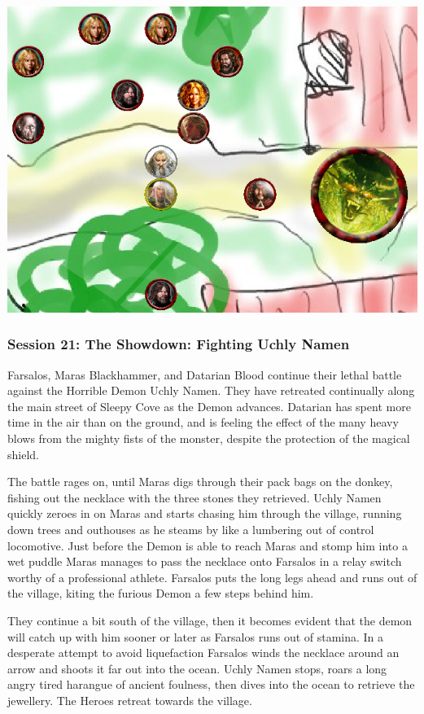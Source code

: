 \begin{center}
\vspace{0.5 cm}
\includegraphics[width=0.7\linewidth]{./figs/playthrough/battle-sleepy-cove.png}
\vspace{0.5 cm}
\end{center}


\subsubsection*{Session 21: The Showdown: Fighting Uchly Namen}
Farsalos, Maras Blackhammer, and Datarian Blood continue their lethal battle against the Horrible Demon Uchly Namen. They have retreated continually along the main street of Sleepy Cove as the Demon advances. Datarian has spent more time in the air than on the ground, and is feeling the effect of the many heavy blows from the mighty fists of the monster, despite the protection of the magical shield.

The battle rages on, until Maras digs through their pack bags on the donkey, fishing out the necklace with the three stones they retrieved. Uchly Namen quickly zeroes in on Maras and starts chasing him through the village, running down trees and outhouses as he steams by like a lumbering out of control locomotive. Just before the Demon is able to reach Maras and stomp him into a wet puddle Maras manages to pass the necklace onto Farsalos in a relay switch worthy of a professional athlete. Farsalos puts the long legs ahead and runs out of the village, kiting the furious Demon a few steps behind him.

They continue a bit south of the village, then it becomes evident that the demon will catch up with him sooner or later as Farsalos runs out of stamina. In a desperate attempt to avoid liquefaction Farsalos winds the necklace around an arrow and shoots it far out into the ocean. Uchly Namen stops, roars a long angry tired harangue of ancient foulness, then dives into the ocean to retrieve the jewellery. The Heroes retreat towards the village.

